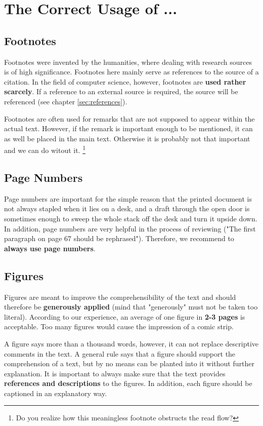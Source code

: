 \chapter{The Correct Usage of ...}


\section{Footnotes}

Footnotes were invented by the humanities, where dealing with research sources is of high
significance. Footnotes here mainly serve as references to the source of a citation.
In the field of computer science, however, footnotes are \textbf{used rather scarcely}.
If a reference to an external source is required, the source will be referenced (see
chapter \ref{sec:references}).

Footnotes are often used for remarks that are not supposed to appear within the 
actual text. However, if the remark is important enough to be mentioned, it 
can as well be placed in the main text. Otherwise it is probably not that important
and we can do witout it.  \footnote{Do you realize how this meaningless footnote
  obstructs the read flow?}


\section{Page Numbers}

Page numbers are important for the simple reason that the printed document is not
always stapled when it lies on a desk, and a draft through the open door is
sometimes enough to sweep the whole stack off the desk and turn it upside down.
In addition, page numbers are very helpful in the process of reviewing ("The first
paragraph on page 67 should be rephrased"). Therefore, we recommend to \textbf{always
  use page numbers}.


\section{Figures}

Figures are meant to improve the comprehensibility of the text and should therefore
be \textbf{generously applied} (mind that "generously" must not be taken
too literal). According to our experience, an average of one figure in \textbf{2-3 pages}
is acceptable. Too many figures would cause the impression of a comic strip.

A figure says more than a thousand words, however, it can not replace descriptive
comments in the text. A general rule says that a figure should support the comprehension
of a text, but by no means can be planted into it without further explanation.
It is important to always make sure that the text provides \textbf{references and descriptions} 
to the figures. In addition, each figure should be captioned in an explanatory way.

